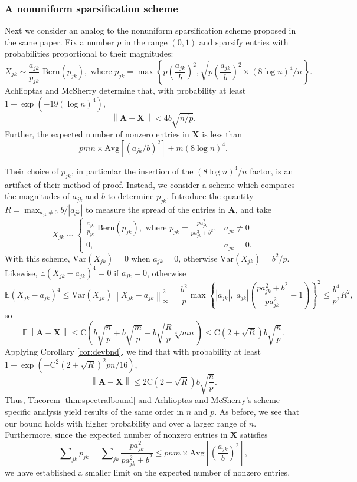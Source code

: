 \documentclass[11pt,letterpaper,twoside,reqno]{amsart}
\newcommand{\mat}[1]{\ensuremath{\bm{#1}}}
\newcommand{\E}{\ensuremath{\mathbb{E}}}
\newcommand{\Prob}[1]{\ensuremath{\mathbb{P}\left(#1\right)}}
\newcommand{\norm}[1]{\ensuremath{\left\|#1\right\|}}
\newcommand{\var}[1]{\ensuremath{\mathrm{Var}(#1)}}
\begin{document}
\subsubsection{A nonuniform sparsification scheme}
Next we consider an analog to the nonuniform sparsification scheme proposed in the same paper. Fix a number $p$ in the range $(0,1)$ and sparsify entries with probabilities proportional to their magnitudes: 
\[
X_{jk}\sim \frac{a_{jk}}{p_{jk}}\text{ Bern}(p_{jk}), \text{ where } p_{jk}=\max\left\{ p\left(\frac{a_{jk}}{b}\right)^{2},\sqrt{p\left(\frac{a_{jk}}{b}\right)^{2}\times(8\log n)^{4}/n}\right\}.
\]
Achlioptas and McSherry determine that, with probability at least $1 - \exp(-19(\log n)^4)$,
\[
\norm{\mat{A}-\mat{X}}<4b\sqrt{n/p}.
\]
Further, the expected number of nonzero entries in $\mat{X}$ is less than
\begin{equation}
pmn\times\text{Avg}[(a_{jk}/b)^{2}]+m(8\log n)^{4}.
\end{equation}


Their choice of $p_{jk}$, in particular the insertion of the $(8\log n)^{4}/n$ factor, is an artifact of their method of proof. Instead, we consider a scheme which compares the magnitudes of $a_{jk}$ and $b$ to determine $p_{jk}$. Introduce the quantity $R=\max_{a_{jk}\neq0}b/|a_{jk}|$ to
measure the spread of the entries in $\mat{A}$, and take 
\[
X_{jk} \sim 
\begin{cases}
\frac{a_{jk}}{p_{jk}}\text{ Bern}(p_{jk}),\text{ where }p_{jk}=\frac{pa_{jk}^{2}}{pa_{jk}^{2}+b^{2}}, & a_{jk}\neq0\\
0, & a_{jk}=0.
\end{cases}
\]
With this scheme, $\var{X_{jk}}=0$ when $a_{jk}=0$, otherwise $\var{X_{jk}}=b^{2}/p$.
Likewise, $\E(X_{jk}-a_{jk})^{4}=0$ if $a_{jk}=0$, otherwise 
\[
\E(X_{jk}-a_{jk})^{4}\leq\var{X_{jk}}\norm{X_{jk}-a_{jk}}_{\infty}^{2}=\frac{b^{2}}{p}\max\left\{|a_{jk}|,|a_{jk}|\left(\frac{pa_{jk}^{2}+b^{2}}{pa_{jk}^{2}}-1\right)\right\}^{2}\leq\frac{b^{4}}{p^{2}}R^{2},
\]
so \[
\E\norm{\mat{A}-\mat{X}}\leq \mathrm{C}\left(b\sqrt{\frac{n}{p}}+b\sqrt{\frac{m}{p}}+b\sqrt{\frac{R}{p}}\sqrt[4]{mn}\right)\leq \mathrm{C}(2+\sqrt{R})b\sqrt{\frac{n}{p}}.
\]
Applying Corollary \ref{cor:devbnd}, we find that %
with probability at least $1-\exp(-\mathrm{C}^{2}(2+\sqrt{R})^{2}pn/16)$,
\[
\norm{\mat{A}-\mat{X}}\leq2\mathrm{C}(2+\sqrt{R})b\sqrt{\frac{n}{p}}.
\]
Thus, Theorem \ref{thm:spectralbound} and Achlioptas and McSherry's scheme-specific analysis yield results of the same order in $n$ and $p$. As before, we see that our bound holds with higher probability and over a larger range of $n$. Furthermore, since the expected number of nonzero entries in $\mat{X}$ satisfies 
\[
\sum\nolimits_{jk}p_{jk} = \sum\nolimits_{jk} \frac{pa_{jk}^2}{pa_{jk}^2 + b^2}\leq pnm\times \text{Avg}\left[\left(\frac{a_{jk}}{b}\right)^2\right],
\]
we have established a smaller limit on the expected number of nonzero entries.  
\end{document}
